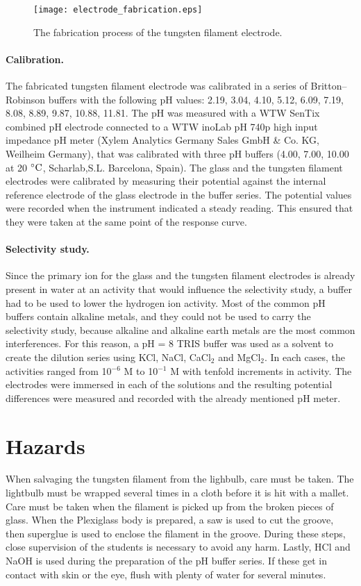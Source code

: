 \documentclass[manuscript=article, journal=jceda8]{achemso}
\begin{document}
\begin{figure}
\centering
\texttt{[image: electrode\_fabrication.eps]}
\caption{The fabrication process of the tungsten filament electrode. }
\label{fig:fabrication}
\end{figure}

\paragraph{Calibration.}

The fabricated tungsten filament electrode was calibrated in a series of Britton--Robinson buffers with the following pH values: 2.19, 3.04, 4.10, 5.12, 6.09, 7.19, 8.08, 8.89, 9.87, 10.88, 11.81. The pH was measured with a WTW SenTix combined pH electrode connected to a WTW inoLab pH 740p high input impedance pH meter (Xylem Analytics Germany Sales GmbH \& Co. KG, Weilheim Germany), that was calibrated with three pH buffers (4.00, 7.00, 10.00 at 20 $\celsius$, Scharlab,S.L. Barcelona, Spain). The glass and the tungsten filament electrodes were calibrated by measuring their potential against the internal reference electrode of the glass electrode in the buffer series. The potential values were recorded when the instrument indicated a steady reading. This ensured that they were taken at the same point of the response curve.


\paragraph{Selectivity study.}

Since the primary ion for the glass and the tungsten filament electrodes is already present in water at an activity that would influence the selectivity study, a buffer had to be used to lower the hydrogen ion activity. Most of the common pH buffers contain alkaline metals, and they could not be used to carry the selectivity study, because alkaline and alkaline earth metals are the most common interferences. For this reason, a pH = 8 TRIS buffer was used as a solvent to create the dilution series using KCl, NaCl, CaCl$_2$ and MgCl$_2$. In each cases, the activities ranged from 10$^{-6}$ M to 10$^{-1}$ M with tenfold increments in activity. The electrodes were immersed in each of the solutions and the resulting potential differences were measured and recorded with the already mentioned pH meter.

\section{Hazards}
When salvaging the tungsten filament from the lighbulb, care must be taken. The lightbulb must be wrapped several times in a cloth before it is hit with a mallet. Care must be taken when the filament is picked up from the broken pieces of glass. When the Plexiglass body is prepared, a saw is used to cut the groove, then superglue is used to enclose the filament in the groove. During these steps, close supervision of the students is necessary to avoid any harm. Lastly, HCl and NaOH is used during the preparation of the pH buffer series. If these get in contact with skin or the eye, flush with plenty of water for several minutes.
\end{document}
